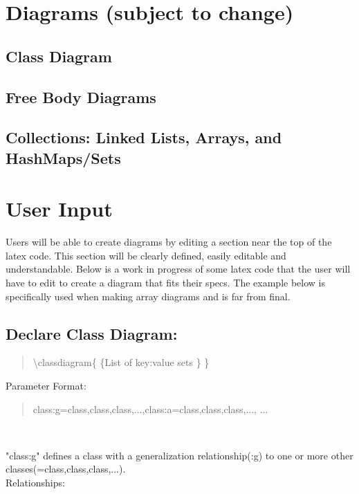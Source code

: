 \documentclass[10pt,a4paper,english]{article}
\begin{document}
\newpage
{}
\thispagestyle{fancy}
\begin{flushleft}
\section*{Diagrams \small{(subject to change)}}
\subsection*{Class Diagram}
\subsection*{Free Body Diagrams}
\subsection*{Collections: Linked Lists, Arrays, and HashMaps/Sets }

\section{User Input}
Users will be able to create diagrams by editing a section near the top of the latex code.  This section will be clearly defined, easily editable and understandable.  Below is a work in progress of some latex code that the user will have to edit to create a diagram that fits their specs. The example below is specifically used when making array diagrams and is far from final.


\subsection*{Declare Class Diagram:}
\begin{quote}{\ttfamily \raggedright \noindent

{\textbackslash}classdiagram{\{} {\{}List of key:value sets {\}} {\}} ~\\

}\end{quote}

Parameter Format:~\\ \medskip
\begin{quote}{\ttfamily \raggedright \noindent
{ {class:g=class,class,class,...},{class:a=class,class,class,...}, ...}
}\end{quote}

~\\ \medskip

"class:g" defines a class with a generalization relationship(:g) to one or more other classes(=class,class,class,...). 
~\\ \medskip
Relationships: ~\\ \medskip


\end{flushleft}
\end{document}
